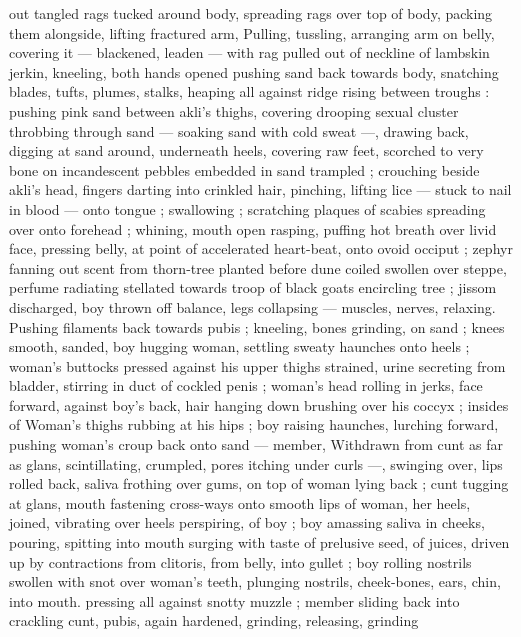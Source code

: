 out tangled rags tucked around body, spreading rags over top of 
body, packing them alongside, lifting fractured arm, Pulling, tussling, 
arranging arm on belly, covering it --- blackened, leaden --- with rag 
pulled out of neckline of lambskin jerkin, kneeling, both hands 
opened pushing sand back towards body, snatching blades, tufts, 
plumes, stalks, heaping all against ridge rising between troughs : 
pushing pink sand between akli's thighs, covering drooping sexual 
cluster throbbing through sand --- soaking sand with cold sweat ---, 
drawing back, digging at sand around, underneath heels, covering 
raw feet, scorched to very bone on incandescent pebbles embedded 
in sand trampled ; crouching beside akli's head, fingers darting into 
crinkled hair, pinching, lifting lice --- stuck to nail in blood --- onto 
tongue ; swallowing ; scratching plaques of scabies spreading over 
onto forehead ; whining, mouth open rasping, puffing hot breath 
over livid face, pressing belly, at point of accelerated heart-beat, 
onto ovoid occiput ; zephyr fanning out scent from thorn-tree planted 
before dune coiled swollen over steppe, perfume radiating stellated 
towards troop of black goats encircling tree ; jissom discharged, boy 
thrown off balance, legs collapsing --- muscles, nerves, relaxing. 
Pushing filaments back towards pubis ; kneeling, bones grinding, on 
sand ; knees smooth, sanded, boy hugging woman, settling sweaty 
haunches onto heels ; woman's buttocks pressed against his upper 
thighs strained, urine secreting from bladder, stirring in duct of 
cockled penis ; woman's head rolling in jerks, face forward, against 
boy's back, hair hanging down brushing over his coccyx ; insides of 
Woman's thighs rubbing at his hips ; boy raising haunches, lurching 
forward, pushing woman's croup back onto sand --- member, 
Withdrawn from cunt as far as glans, scintillating, crumpled, pores 
itching under curls ---, swinging over, lips rolled back, saliva frothing 
over gums, on top of woman lying back ; cunt tugging at glans, 
mouth fastening cross-ways onto smooth lips of woman, her heels, 
joined, vibrating over heels perspiring, of boy ; boy amassing saliva 
in cheeks, pouring, spitting into mouth surging with taste of 
prelusive seed, of juices, driven up by contractions from clitoris, from 
belly, into gullet ; boy rolling nostrils swollen with snot over woman's 
teeth, plunging nostrils, cheek-bones, ears, chin, into mouth. 
pressing all against snotty muzzle ; member sliding back into 
crackling cunt, pubis, again hardened, grinding, releasing, grinding 
